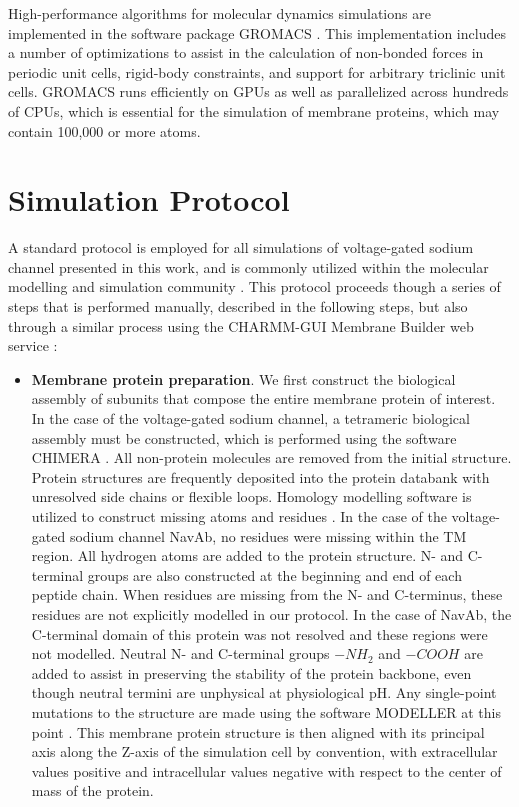 \begin{refsection}
High-performance algorithms for molecular dynamics simulations are implemented in the software package GROMACS \cite{Abraham:2015gj,Hess:2008db,Pronk:2013ef}. This implementation includes a number of optimizations to assist in the calculation of non-bonded forces in periodic unit cells, rigid-body constraints, and support for arbitrary triclinic unit cells. GROMACS runs efficiently on GPUs as well as parallelized across hundreds of CPUs, which is essential for the simulation of membrane proteins, which may contain 100,000 or more atoms.

\section{Simulation Protocol}

A standard protocol is employed for all simulations of voltage-gated sodium channel presented in this work, and is commonly utilized within the molecular modelling and simulation community \cite{Kandt:2007wz}. This protocol proceeds though a series of steps that is performed manually, described in the following steps, but also through a similar process using the CHARMM-GUI Membrane Builder web service \cite{Wu:2014uc}: 
\begin{itemize}
\item \textbf{Membrane protein preparation}. We first construct the biological assembly of subunits that compose the entire membrane protein of interest. In the case of the voltage-gated sodium channel, a tetrameric biological assembly must be constructed, which is performed using the software CHIMERA \cite{Pettersen:2004kh}. All non-protein molecules are removed from the initial structure. Protein structures are frequently deposited into the protein databank with unresolved side chains or flexible loops. Homology modelling software is utilized to construct missing atoms and residues \cite{Fiser:2003we}. In the case of the voltage-gated sodium channel NavAb, no residues were missing within the TM region. All hydrogen atoms are added to the protein structure. N- and C-terminal groups are also constructed at the beginning and end of each peptide chain. When residues are missing from the N- and C-terminus, these residues are not explicitly modelled in our protocol. In the case of NavAb, the C-terminal domain of this protein was not resolved and these regions were not modelled. Neutral N- and C-terminal groups $-NH_2$ and $-COOH$ are added to assist in preserving the stability of the protein backbone, even though neutral termini are unphysical at physiological pH. Any single-point mutations to the structure are made using the software MODELLER at this point \cite{Fiser:2003we}. This membrane protein structure is then aligned with its principal axis along the Z-axis of the simulation cell by convention, with extracellular values positive and intracellular values negative with respect to the center of mass of the protein.

\end{itemize}
\end{refsection}
